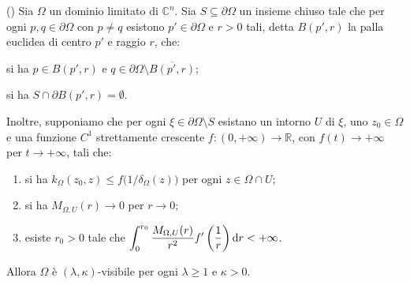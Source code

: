 \begin{thm} \label{extvis}
    (\cite[Theorem 1.9]{CMS}) Sia $\Omega$ un dominio limitato di $\mathbb{C}^n$. Sia $S\subseteq\partial\Omega$ un insieme chiuso tale che per ogni $p,q\in\partial\Omega$ con $p\not=q$ esistono $p'\in\partial\Omega$ e $r>0$ tali, detta $B(p',r)$ la palla euclidea di centro $p'$ e raggio $r$, che:
    \begin{nlist}
        \item si ha $p\in B(p',r)$ e $q\in\partial\Omega\setminus\overline{B(p',r)}$;
        \item si ha $S\cap\partial B(p',r)=\emptyset$.
    \end{nlist}
    
    Inoltre, supponiamo che per ogni $\xi\in\partial\Omega\setminus S$ esistano un intorno $U$ di $\xi$, uno $z_0\in\Omega$ e una funzione $C^1$ strettamente crescente $f:(0,+\infty)\longrightarrow\mathbb{R}$, con $f(t)\longrightarrow+\infty$ per $t\longrightarrow+\infty$, tali che:
    \begin{enumerate}[label={(\arabic*)}]
        \item si ha $k_\Omega(z_0,z) \le f\big(1/\delta_\Omega(z)\big)$ per ogni $z\in\Omega\cap U$;
        \item si ha $M_{\Omega,U}(r)\longrightarrow 0$ per $r\longrightarrow 0$;
        \item esiste $r_0>0$ tale che $\displaystyle\int_0^{r_0}\frac{M_{\Omega,U}(r)}{r^2}f'\left(\frac{1}{r}\right)\mathop{}\!\mathrm{d} r<+\infty$.
    \end{enumerate}

    Allora $\Omega$ è $(\lambda,\kappa)$-visibile per ogni $\lambda \ge 1$ e $\kappa>0$.
\end{thm}

